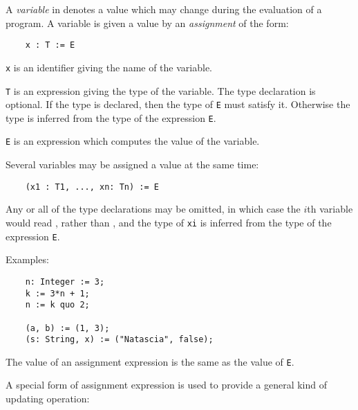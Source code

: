 
A {\em variable\/} in \asharp{} denotes a value which may change
during the evaluation of a program.
A variable is given a value by an {\em assignment\/} of the form:

\begin{small}
\begin{verbatim}
    x : T := E
\end{verbatim}
\end{small}

\verb"x" is an identifier giving the name of the variable.

\verb"T" is an expression giving the type of the variable.
The type declaration is optional.  If the type is declared, then the
type of \verb"E" must satisfy it.  Otherwise the type is inferred
from the type of the expression \verb"E".

\verb"E" is an expression which computes the value of the variable.

Several variables may be assigned a value at the same time:

\begin{small}
\begin{verbatim}
    (x1 : T1, ..., xn: Tn) := E
\end{verbatim}
\end{small}

Any or all of the type declarations may be omitted,
in which case the $i$\/th variable would read ,
rather than , and the type of \verb"xi" is
inferred from the type of the expression \verb"E".

Examples:

\begin{small}
\begin{verbatim}
    n: Integer := 3;
    k := 3*n + 1;
    n := k quo 2;

    (a, b) := (1, 3);
    (s: String, x) := ("Natascia", false);
\end{verbatim}
\end{small}

The value of an assignment expression is the same as the value of \verb"E".

A special form of assignment expression is used to provide a general kind of
updating operation:

